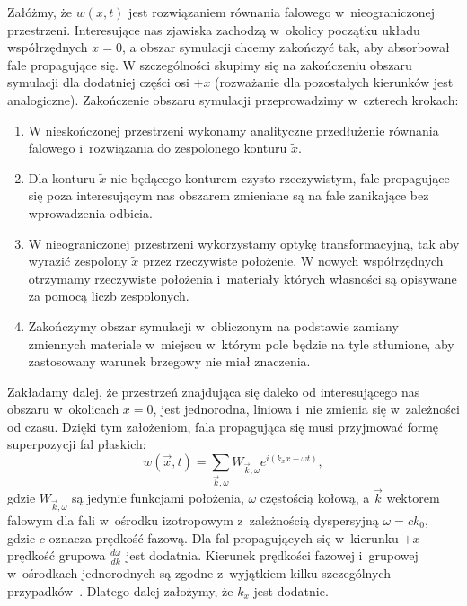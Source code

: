 Załóżmy, że $w(x,t)$ jest rozwiązaniem równania falowego w~nieograniczonej przestrzeni. Interesujące nas zjawiska zachodzą w~okolicy początku układu współrzędnych $x=0$, a obszar symulacji chcemy zakończyć tak, aby absorbował fale propagujące się. W szczególności skupimy się na zakończeniu obszaru symulacji dla dodatniej części osi $+x$ (rozważanie dla pozostałych kierunków jest analogiczne). Zakończenie obszaru symulacji przeprowadzimy w~czterech krokach:
\begin{enumerate}
	\item W nieskończonej przestrzeni wykonamy analityczne przedłużenie równania falowego i~rozwiązania do zespolonego konturu $\tilde{x}$.
	\item Dla konturu $\tilde{x}$ nie będącego konturem czysto rzeczywistym, fale propagujące się poza interesującym nas obszarem zmieniane są na fale zanikające bez wprowadzenia odbicia.
	\item W nieograniczonej przestrzeni wykorzystamy optykę transformacyjną,  tak aby wyrazić zespolony $\tilde{x}$ przez rzeczywiste położenie. W nowych współrzędnych otrzymamy rzeczywiste położenia i~materiały których własności są opisywane za pomocą liczb zespolonych.
	\item Zakończymy obszar symulacji w~obliczonym na podstawie zamiany zmiennych materiale w~miejscu w~którym pole będzie na tyle stłumione, aby zastosowany warunek brzegowy nie miał znaczenia.
\end{enumerate}

Zakładamy dalej, że przestrzeń znajdująca się daleko od interesującego nas obszaru w~okolicach $x=0$, jest jednorodna, liniowa i~nie zmienia się w~zależności od czasu. Dzięki tym założeniom, fala propagująca się musi przyjmować formę superpozycji fal płaskich:
\begin{equation}
	w(\vec{x},t)= \sum_{\vec{k},\omega} W_{\vec{k},\omega} e^{i (k_x x-\omega t)},
	\label{eq:pml-cos}
\end{equation}
gdzie $W_{\vec{k},\omega}$ są jedynie funkcjami położenia, $\omega$ częstością kołową, a $\vec{k}$ wektorem falowym dla fali w~ośrodku izotropowym z~zależnością dyspersyjną $\omega=c k_0$, gdzie $c$ oznacza prędkość fazową. Dla fal propagujących się w~kierunku $+x$ prędkość grupowa $\frac{d \omega}{d k}$ jest dodatnia. Kierunek prędkości fazowej i~grupowej w~ośrodkach jednorodnych są zgodne z~wyjątkiem kilku szczególnych przypadków~\cite{teixeira1998general}. Dlatego dalej założymy, że $k_x$ jest dodatnie. 


